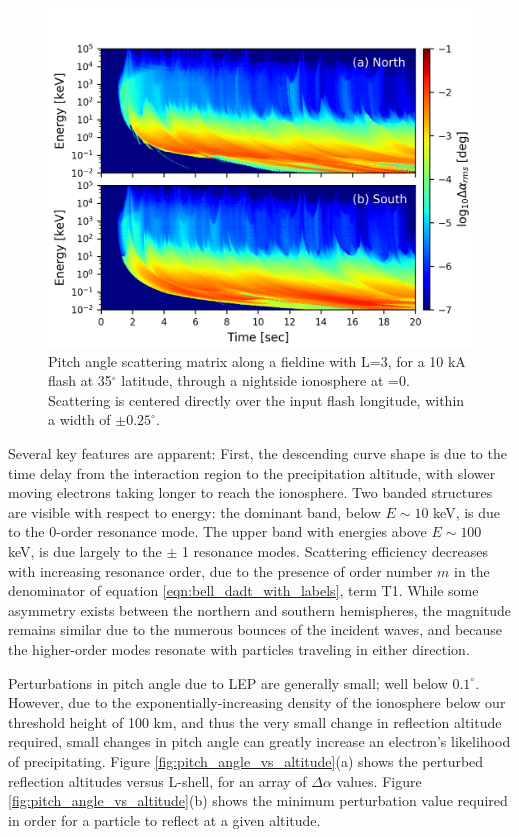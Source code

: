 \begin{figure}[h]
\begin{center}
\includegraphics{figures/dA_E-t_spectra.png}
\caption[Pitch angle scattering matrix for a flash at 35$^\circ$ latitude and L=3]{Pitch angle scattering matrix along a fieldine with L=3, for a 10 kA flash at 35$^\circ$ latitude, through a nightside ionosphere at \kp{}=0. Scattering is centered directly over the input flash longitude, within a width of $\pm0.25^\circ.$}
\label{fig:dA_spectra}
\end{center}
\end{figure}

Several key features are apparent: First, the descending curve shape is due to the time delay from the interaction region to the precipitation altitude, with slower moving electrons taking longer to reach the ionosphere. Two banded structures are visible with respect to energy: the dominant band, below $E \sim 10$ keV, is due to the 0-order resonance mode. The upper band with energies above $E  \sim 100$ keV, is due largely to the $\pm$ 1 resonance modes. Scattering efficiency decreases with increasing resonance order, due to the presence of order number $m$ in the denominator of equation \eqref{eqn:bell_dadt_with_labels}, term T1. While some asymmetry exists between the northern and southern hemispheres, the magnitude remains similar due to the numerous bounces of the incident waves, and because the higher-order modes resonate with particles traveling in either direction.

Perturbations in pitch angle due to LEP are generally small; well below $0.1^\circ$. However, due to the exponentially-increasing density of the ionosphere below our threshold height of 100 km, and thus the very small change in reflection altitude required, small changes in pitch angle can greatly increase an electron's likelihood of precipitating. Figure \ref{fig:pitch_angle_vs_altitude}(a) shows the perturbed reflection altitudes versus L-shell, for an array of $\Delta \alpha$ values. Figure \ref{fig:pitch_angle_vs_altitude}(b) shows the minimum perturbation value required in order for a particle to reflect at a given altitude.

